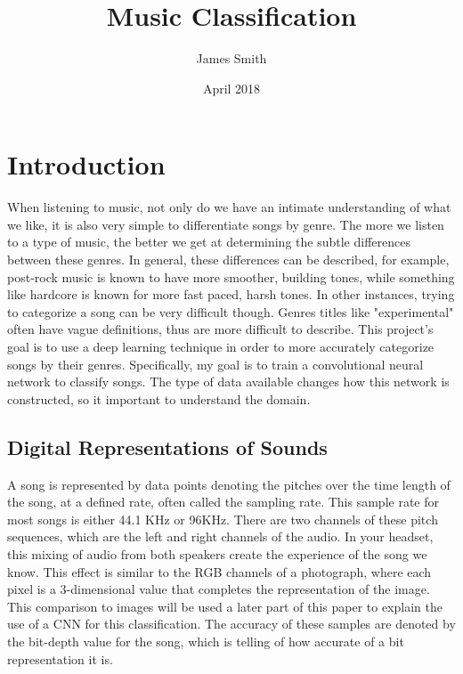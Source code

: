 \documentclass{article}
\title{Music Classification}
\author{James Smith}
\date{April 2018}
\begin{document}
\maketitle

\section{Introduction}
When listening to music, not only do we have an intimate understanding of what we like, it is also very simple to differentiate songs by genre. The more we listen to a type of music, the better we get at determining the subtle differences between these genres. In general, these differences can be described, for example, post-rock music is known to have more smoother, building tones, while something like hardcore is known for more fast paced, harsh tones. In other instances, trying to categorize a song can be very difficult though. Genres titles like "experimental" often have vague definitions, thus are more difficult to describe. This project's goal is to use a deep learning technique in order to more accurately categorize songs by their genres. Specifically, my goal is to train a convolutional neural network to classify songs. The type of data available changes how this network is constructed, so it important to understand the domain.
\subsection{Digital Representations of Sounds}
 A song is represented by data points denoting the pitches over the time length of the song, at a defined rate, often called the sampling rate.  This sample rate for most songs is either 44.1 KHz or 96KHz. There are two channels of these pitch sequences, which are the left and right channels of the audio. In your headset, this mixing of audio from both speakers create the experience of the song we know. This effect is similar to the RGB channels of a photograph, where each pixel is a 3-dimensional value that completes the representation of the image. This comparison to images will be used a later part of this paper to explain the use of a CNN for this classification. The accuracy of these samples are denoted by the bit-depth value for the song, which is telling of how accurate of a bit representation it is.
\end{document}
